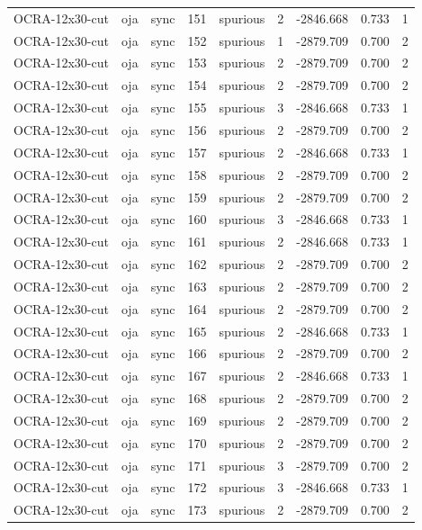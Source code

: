 \begin{tabular}{lllrlrrrr}
OCRA-12x30-cut & oja & sync & 151 & spurious & 2 & -2846.668 & 0.733 & 1 \\
OCRA-12x30-cut & oja & sync & 152 & spurious & 1 & -2879.709 & 0.700 & 2 \\
OCRA-12x30-cut & oja & sync & 153 & spurious & 2 & -2879.709 & 0.700 & 2 \\
OCRA-12x30-cut & oja & sync & 154 & spurious & 2 & -2879.709 & 0.700 & 2 \\
OCRA-12x30-cut & oja & sync & 155 & spurious & 3 & -2846.668 & 0.733 & 1 \\
OCRA-12x30-cut & oja & sync & 156 & spurious & 2 & -2879.709 & 0.700 & 2 \\
OCRA-12x30-cut & oja & sync & 157 & spurious & 2 & -2846.668 & 0.733 & 1 \\
OCRA-12x30-cut & oja & sync & 158 & spurious & 2 & -2879.709 & 0.700 & 2 \\
OCRA-12x30-cut & oja & sync & 159 & spurious & 2 & -2879.709 & 0.700 & 2 \\
OCRA-12x30-cut & oja & sync & 160 & spurious & 3 & -2846.668 & 0.733 & 1 \\
OCRA-12x30-cut & oja & sync & 161 & spurious & 2 & -2846.668 & 0.733 & 1 \\
OCRA-12x30-cut & oja & sync & 162 & spurious & 2 & -2879.709 & 0.700 & 2 \\
OCRA-12x30-cut & oja & sync & 163 & spurious & 2 & -2879.709 & 0.700 & 2 \\
OCRA-12x30-cut & oja & sync & 164 & spurious & 2 & -2879.709 & 0.700 & 2 \\
OCRA-12x30-cut & oja & sync & 165 & spurious & 2 & -2846.668 & 0.733 & 1 \\
OCRA-12x30-cut & oja & sync & 166 & spurious & 2 & -2879.709 & 0.700 & 2 \\
OCRA-12x30-cut & oja & sync & 167 & spurious & 2 & -2846.668 & 0.733 & 1 \\
OCRA-12x30-cut & oja & sync & 168 & spurious & 2 & -2879.709 & 0.700 & 2 \\
OCRA-12x30-cut & oja & sync & 169 & spurious & 2 & -2879.709 & 0.700 & 2 \\
OCRA-12x30-cut & oja & sync & 170 & spurious & 2 & -2879.709 & 0.700 & 2 \\
OCRA-12x30-cut & oja & sync & 171 & spurious & 3 & -2879.709 & 0.700 & 2 \\
OCRA-12x30-cut & oja & sync & 172 & spurious & 3 & -2846.668 & 0.733 & 1 \\
OCRA-12x30-cut & oja & sync & 173 & spurious & 2 & -2879.709 & 0.700 & 2 \\

\end{tabular}
